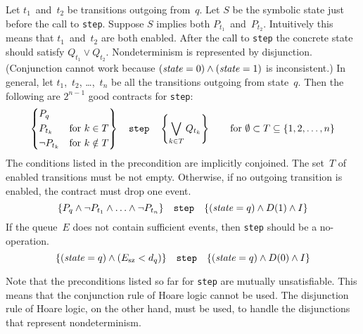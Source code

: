 \documentclass{article} %
\newcommand{\3}[3]{\{\,#1\,\}\;#2\;\{\,#3\,\}}
\begin{document}
Let $t_1$~and~$t_2$ be transitions outgoing from~$q$.
Let $S$ be the symbolic state just before the call to {\tt step}.
Suppose $S$ implies both $P_{t_1}$~and~$P_{t_2}$.
Intuitively this means that $t_1$~and~$t_2$ are both enabled.
After the call to {\tt step} the concrete state should satisfy $Q_{t_1}\lor Q_{t_2}$.
Nondeterminism is represented by disjunction.
(Conjunction cannot work because $({\it state}=0)\land({\it state}=1)$ is inconsistent.)
In general, let $t_1$,~$t_2$, \dots,~$t_n$ be all the transitions outgoing from state~$q$.
Then the following are $2^{n-1}$ good contracts for {\tt step}:
\[
  \left\{\begin{aligned}
  &P_q&&\\
  &P_{t_k}  &&\text{for $k\in T$} \\
  &\lnot P_{t_k}  &&\text{for $k\notin T$}
  \end{aligned}\right\}
  \quad\text{\tt step}\quad
  \left\{\bigvee_{k\in T}Q_{t_k}\right\}
  \qquad\text{for $\emptyset\subset T\subseteq \{1,2,\ldots,n\}$}
\]
The conditions listed in the precondition are implicitly conjoined.
The set~$T$ of enabled transitions must be not empty.
Otherwise, if no outgoing transition is enabled, the contract must drop one event.
\[
  \{P_q\land\lnot P_{t_1}\land\ldots\land\lnot P_{t_n}\}
  \quad\text{\tt step}\quad
  \{({\it state}=q)\land D(1)\land I\}
\]
If the queue~$E$ does not contain sufficient events, then {\tt step} should be a no-operation.
\[
  \{({\it state}=q)\land(E_{\rm sz}<d_q)\}
  \quad\text{\tt step}\quad
  \{({\it state}=q)\land D(0)\land I\}
\]

Note that the preconditions listed so far for {\tt step} are mutually unsatisfiable.
This means that the conjunction rule of Hoare logic cannot be used.
The disjunction rule of Hoare logic, on the other hand, must be used, to handle the disjunctions that represent nondeterminism.
\end{document}
